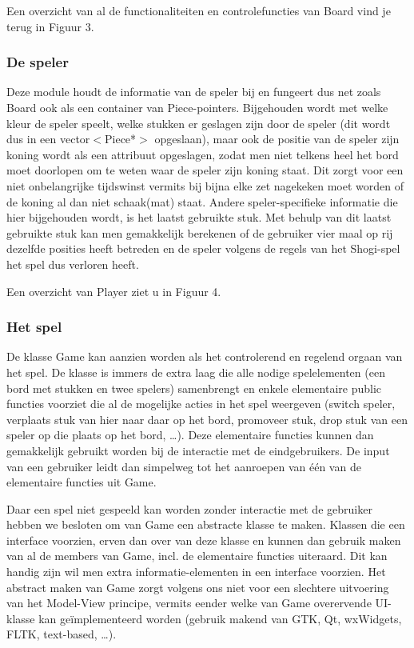 \documentclass[a4paper,11pt,oneside, titlepage]{article}
\begin{document}
Een overzicht van al de functionaliteiten en controlefuncties van Board vind je terug in Figuur 3.
\subsubsection{De speler}
Deze module houdt de informatie van de speler bij en fungeert dus net zoals Board ook als een container van Piece-pointers. 
Bijgehouden wordt met welke kleur de speler speelt, welke stukken er geslagen zijn door de speler (dit wordt dus in een vector$<$Piece*$>$ opgeslaan), maar ook de positie van de speler zijn koning wordt als een attribuut opgeslagen, zodat men niet telkens heel het bord moet doorlopen om te weten waar de speler zijn koning staat. Dit zorgt voor een niet onbelangrijke tijdswinst vermits bij bijna elke zet nagekeken moet worden of de koning al dan niet schaak(mat) staat. Andere speler-specifieke informatie die hier bijgehouden wordt, is het laatst gebruikte stuk. Met behulp van dit laatst gebruikte stuk kan men gemakkelijk berekenen of de gebruiker vier maal op rij dezelfde posities heeft betreden en de speler volgens de regels van het Shogi-spel het spel dus verloren heeft.

Een overzicht van Player ziet u in Figuur 4.
\subsubsection{Het spel}
De klasse Game kan aanzien worden als het controlerend en regelend orgaan van het spel. De klasse is immers de extra laag die alle nodige spelelementen (een bord met stukken en twee spelers) samenbrengt en enkele elementaire public functies voorziet die al de mogelijke acties in het spel weergeven (switch speler, verplaats stuk van hier naar daar op het bord, promoveer stuk, drop stuk van een speler op die plaats op het bord, \ldots). Deze elementaire functies kunnen dan gemakkelijk gebruikt worden bij de interactie met de eindgebruikers. De input van een gebruiker leidt dan simpelweg tot het aanroepen van \'e\'en van de elementaire functies uit Game.

Daar een spel niet gespeeld kan worden zonder interactie met de gebruiker hebben we besloten om van Game een abstracte klasse te maken. Klassen die een interface voorzien, erven dan over van deze klasse en kunnen dan gebruik maken van al de members van Game, incl. de elementaire functies uiteraard. Dit kan handig zijn wil men extra informatie-elementen in een interface voorzien. Het abstract maken van Game zorgt volgens ons niet voor een slechtere uitvoering van het Model-View principe, vermits eender welke van Game overervende UI-klasse kan ge\"implementeerd worden (gebruik makend van GTK, Qt, wxWidgets, FLTK, text-based, \ldots).
\end{document}
